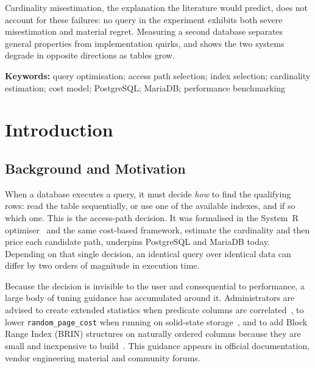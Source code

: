 \documentclass[12pt, a4paper]{article}
\newcommand{\rpc}{\texttt{random\_page\_cost}}
\begin{document}
Cardinality misestimation, the explanation the literature would predict,
does not account for these failures: no query in the experiment exhibits
both severe misestimation and material regret. Measuring a second
database separates general properties from implementation quirks, and
shows the two systems degrade in opposite directions as tables grow.

\vspace{0.5em}
\noindent\textbf{Keywords:} query optimisation; access path selection;
index selection; cardinality estimation; cost model; PostgreSQL;
MariaDB; performance benchmarking

\newpage

\tableofcontents
\newpage
\listoffigures
\listoftables
\newpage

\section{Introduction}
\label{sec:intro}

\subsection{Background and Motivation}

When a database executes a query, it must decide \emph{how} to find the
qualifying rows: read the table sequentially, or use one of the
available indexes, and if so which one. This is the access-path
decision. It was formalised in the System~R optimiser~\cite{selinger1979access}
and the same cost-based framework, estimate the cardinality and then
price each candidate path, underpins PostgreSQL and MariaDB today.
Depending on that single decision, an identical query over identical
data can differ by two orders of magnitude in execution time.

Because the decision is invisible to the user and consequential to
performance, a large body of tuning guidance has accumulated around it.
Administrators are advised to create extended statistics when predicate
columns are correlated~\cite{pgdocs17createstats}, to lower \rpc{} when
running on solid-state storage~\cite{pgdocs17runtimeconfig}, and to add
Block Range Index (BRIN) structures on naturally ordered columns because
they are small and inexpensive to build~\cite{pgdocs17brin}. This
guidance appears in official documentation, vendor engineering material
and community forums.
\end{document}

